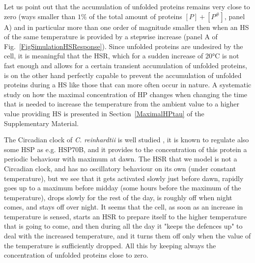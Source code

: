 \documentclass[oneside, 10pt, a4paper, twocolumn]{article}
\begin{document}
Let us point out that the accumulation of unfolded proteins remains very close to zero (ways smaller than $1\%$ of the total amount of proteins $\left[P\right]+\left[P^\#\right]$, panel A) and in particular more than one order of magnitude smaller then when an HS of the same temperature is provided by a stepwise increase (panel A of Fig.~\ref{FigSimulationHSResponse}). Since unfolded proteins are undesired by the cell, it is meaningful that the HSR, which for a sudden increase of 20°C is not fast enough and allows for a certain transient accumulation of unfolded proteins, is on the other hand perfectly capable to prevent the accumulation of unfolded proteins during a HS like those that can more often occur in nature. 
A systematic study on how the maximal concentration of HP changes when changing the time that is needed to increase the temperature from the ambient value to a higher value providing HS is presented in Section~\ref{MaximalHPtau} of the Supplementary Material.

The Circadian clock of \emph{C. reinhardtii} is well studied \cite{Mittag2005,Jacobshagen2001}, it is known to regulate also some HSP as e.g. HSP70B, and it provides to the concentration of this protein a periodic behaviour with maximum at dawn. The HSR that we model is not a Circadian clock, and has no oscillatory behaviour on its own (under constant temperature), but we see that it gets activated slowly just before dawn, rapidly goes up to a maximum before midday (some hours before the maximum of the temperature), drops slowly for the rest of the day, is roughly off when night comes, and stays off over night. It seems that the cell, as soon as an increase in temperature is sensed, starts an HSR to prepare itself to the higher temperature that is going to come, and then during all the day it "keeps the defences up" to deal with the increased temperature, and it turns them off only when the value of the temperature is sufficiently dropped. All this by keeping always the concentration of unfolded proteins close to zero.

\end{document}
